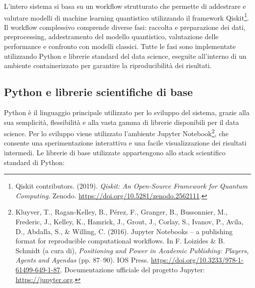 L'intero sistema si basa su un workflow strutturato che permette di addestrare e valutare modelli di machine learning quantistico utilizzando il framework Qiskit\footnote{Qiskit contributors. (2019). \textit{Qiskit: An Open-Source Framework for Quantum Computing}. Zenodo. \url{https://doi.org/10.5281/zenodo.2562111}.}. Il workflow complessivo comprende diverse fasi: raccolta e preparazione dei dati, preprocessing, addestramento del modello quantistico, valutazione delle performance e confronto con modelli classici. Tutte le fasi sono implementate utilizzando Python e librerie standard del data science, eseguite all'interno di un ambiente containerizzato per garantire la riproducibilità dei risultati.

\subsection{Python e librerie scientifiche di base}
Python è il linguaggio principale utilizzato per lo sviluppo del sistema, grazie alla sua semplicità, flessibilità e alla vasta gamma di librerie disponibili per il data science. Per lo sviluppo viene utilizzato l'ambiente Jupyter Notebook\footnote{Kluyver, T., Ragan-Kelley, B., Pérez, F., Granger, B., Bussonnier, M., Frederic, J., Kelley, K., Hamrick, J., Grout, J., Corlay, S., Ivanov, P., Avila, D., Abdalla, S., \& Willing, C. (2016). Jupyter Notebooks -- a publishing format for reproducible computational workflows. In F. Loizides \& B. Schmidt (a cura di), \textit{Positioning and Power in Academic Publishing: Players, Agents and Agendas} (pp. 87--90). IOS Press. \url{https://doi.org/10.3233/978-1-61499-649-1-87}. Documentazione ufficiale del progetto Jupyter: \url{https://jupyter.org}.}, che consente una sperimentazione interattiva e una facile visualizzazione dei risultati intermedi. Le librerie di base utilizzate appartengono allo stack scientifico standard di Python:

